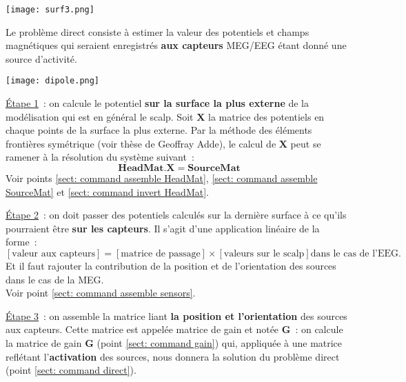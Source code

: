 \centerline{\texttt{[image: surf3.png]}}

\noindent
Le problème direct consiste à estimer la valeur des potentiels et champs magnétiques qui seraient enregistrés \textbf{aux
capteurs} MEG/EEG étant donné une source d'activité.

\centerline{\texttt{[image: dipole.png]}}

\noindent
\underline{Étape 1}~: on calcule le potentiel \textbf{sur la surface la plus externe} de la modélisation qui est en général le
scalp.  Soit $\mathbf{X}$ la matrice des potentiels en chaque points de la surface la plus externe. Par la méthode des éléments
frontières symétrique (voir thèse de Geoffray Adde), le calcul de $\mathbf{X}$ peut se ramener à la résolution du système
suivant~:
\[
    \mathbf{HeadMat} . \mathbf{X} = \mathbf{SourceMat}
\]
Voir points \ref{sect: command assemble HeadMat}, \ref{sect: command assemble SourceMat} et \ref{sect: command invert HeadMat}.

\medskip

\noindent
\underline{Étape 2}~: on doit passer des potentiels calculés sur la dernière surface à ce qu'ils pourraient être \textbf{sur les
capteurs}. Il s'agit d'une application linéaire de la forme~:\\
\[
    \left[ \mbox{valeur aux capteurs} \right] =
    \left[ \mbox{matrice de passage} \right] \times \left[ \mbox{valeurs sur le scalp} \right] \mbox{dans le cas de l'EEG.}
\]
Et il faut rajouter la contribution de la position et de l'orientation des sources dans le cas de la MEG.\\
Voir point \ref{sect: command assemble sensors}.

\medskip

\noindent
\underline{Étape 3}~: on assemble la matrice liant \textbf{la position et l'orientation} des sources aux capteurs. Cette matrice
est appelée matrice de gain et notée $\mathbf{G}$~: on calcule la matrice de gain $\mathbf{G}$ (point \ref{sect: command gain})
qui, appliquée à une matrice reflétant l'\textbf{activation} des sources, nous donnera la solution du problème direct (point
\ref{sect: command direct}).
